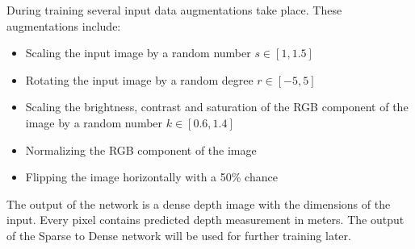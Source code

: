 \documentclass[twoside]{ctuthesis}
\theoremstyle{plain}
\theoremstyle{definition}
\theoremstyle{note}
\begin{document}
During training several input data augmentations take place. These augmentations include:
\begin{itemize}
	\item Scaling the input image by a random number $s\in[1,1.5]$
	\item Rotating the input image by a random degree $r\in[-5,5]$
	\item Scaling the brightness, contrast and saturation of the RGB component of the image by a random number $k\in[0.6,1.4]$
	\item Normalizing the RGB component of the image
	\item Flipping the image horizontally with a 50\% chance
\end{itemize}
The output of the network is a dense depth image with the dimensions of the input. Every pixel contains predicted depth measurement in meters. The output of the Sparse to Dense network will be used for further training later.
\end{document}

